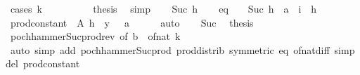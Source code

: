 \begin{isabellebody}
%
\isadelimproof
%
\endisadelimproof
%
\isatagproof
{}\isamarkupfalse%
\ {\isacharparenleft}{\kern0pt}cases\ k{\isacharparenright}{\kern0pt}\isanewline
\ \ \isamarkupfalse%
\ {}\isanewline
\ \ \isamarkupfalse%
\ \isamarkupfalse%
\ {\isacharquery}{\kern0pt}thesis\ \isamarkupfalse%
\ simp\isanewline
{}\isamarkupfalse%
\isanewline
\ \ \isamarkupfalse%
\ {\isacharparenleft}{\kern0pt}Suc\ h{\isacharparenright}{\kern0pt}\isanewline
\ \ \isamarkupfalse%
\ eq{\isacharcolon}{\kern0pt}\ {\isachardoublequoteopen}{\isacharparenleft}{\kern0pt}{\isacharparenleft}{\kern0pt}{\isacharminus}{\kern0pt}\ {}{\isacharparenright}{\kern0pt}\ {\isacharcircum}{\kern0pt}\ Suc\ h\ {\isacharcolon}{\kern0pt}{\isacharcolon}{\kern0pt}\ {\isacharprime}{\kern0pt}a{\isacharparenright}{\kern0pt}\ {\isacharequal}{\kern0pt}\ {\isacharparenleft}{\kern0pt}{\isasymProd}i\ {\isacharequal}{\kern0pt}\ {}{\isachardot}{\kern0pt}{\isachardot}{\kern0pt}h{\isachardot}{\kern0pt}\ {\isacharminus}{\kern0pt}\ {}{\isacharparenright}{\kern0pt}{\isachardoublequoteclose}\isanewline
\ \ \ \ \isamarkupfalse%
\ prod{\isacharunderscore}{\kern0pt}constant\ {\isacharbrackleft}{\kern0pt}\ A{\isacharequal}{\kern0pt}{\isachardoublequoteopen}{\isacharbraceleft}{\kern0pt}{}{\isachardot}{\kern0pt}{\isachardot}{\kern0pt}\ h{\isacharbraceright}{\kern0pt}{\isachardoublequoteclose}\ \ y{\isacharequal}{\kern0pt}{\isachardoublequoteopen}{\isacharminus}{\kern0pt}\ {}\ {\isacharcolon}{\kern0pt}{\isacharcolon}{\kern0pt}\ {\isacharprime}{\kern0pt}a{\isachardoublequoteclose}{\isacharbrackright}{\kern0pt}\isanewline
\ \ \ \ \isamarkupfalse%
\ auto\isanewline
\ \ \isamarkupfalse%
\ Suc\ \isamarkupfalse%
\ {\isacharquery}{\kern0pt}thesis\isanewline
\ \ \ \ \isamarkupfalse%
\ pochhammer{\isacharunderscore}{\kern0pt}Suc{\isacharunderscore}{\kern0pt}prod{\isacharunderscore}{\kern0pt}rev\ {\isacharbrackleft}{\kern0pt}of\ {\isachardoublequoteopen}b\ {\isacharminus}{\kern0pt}\ of{\isacharunderscore}{\kern0pt}nat\ k\ {\isacharplus}{\kern0pt}\ {}{\isachardoublequoteclose}{\isacharbrackright}{\kern0pt}\ \isanewline
\ \ \ \ \isamarkupfalse%
\ {\isacharparenleft}{\kern0pt}auto\ simp\ add{\isacharcolon}{\kern0pt}\ pochhammer{\isacharunderscore}{\kern0pt}Suc{\isacharunderscore}{\kern0pt}prod\ prod{\isachardot}{\kern0pt}distrib\ {\isacharbrackleft}{\kern0pt}symmetric{\isacharbrackright}{\kern0pt}\ eq\ of{\isacharunderscore}{\kern0pt}nat{\isacharunderscore}{\kern0pt}diff\ simp\ del{\isacharcolon}{\kern0pt}\ prod{\isacharunderscore}{\kern0pt}constant{\isacharparenright}{\kern0pt}\isanewline

\end{isabellebody}
